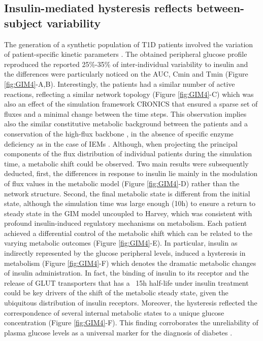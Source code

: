 \subsection{Insulin-mediated hysteresis reflects between-subject variability}
The generation of a synthetic population of T1D patients involved the variation of patient-specific kinetic parameters \cite{schaller2013generic}. The obtained peripheral glucose profile reproduced the reported 25\%-35\% of inter-individual variability to insulin and the differences were particularly noticed on the AUC, Cmin and Tmin (Figure \ref{fig:GIM4}-A,B). Interestingly, the patients had a similar number of active reactions, reflecting a similar network topology (Figure \ref{fig:GIM4}-C) which was also an effect of the simulation framework CRONICS that ensured a sparse set of fluxes and a minimal change between the time steps. This observation implies also the similar constitutive metabolic background between the patients and a conservation of the high-flux backbone \cite{almaas2004global}, in the absence of specific enzyme deficiency as in the case of IEMs \cite{sahoo2012compendium}. Although, when projecting the principal components of the flux distribution of individual patients during the simulation time, a metabolic shift could be observed. Two main results were subsequently deducted, first, the differences in response to insulin lie mainly in the modulation of flux values in the metabolic model (Figure \ref{fig:GIM4}-D) rather than the network structure. Second, the final metabolic state is different from the initial state, although the simulation time was large enough (10h) to ensure a return to steady state in the GIM model uncoupled to Harvey, which was consistent  with profound insulin-induced regulatory mechanisms on metabolism. Each patient achieved a differential control of the metabolic shift which can be related to the varying metabolic outcomes (Figure \ref{fig:GIM4}-E). In particular, insulin as indirectly represented by the glucose peripheral levels, induced a hysteresis in metabolism (Figure \ref{fig:GIM4}-F) which denotes the dramatic metabolic changes of insulin administration. In fact, the binding of insulin to its receptor and the release of GLUT transporters that has a ~15h half-life under insulin treatment \cite{sargeant1993effect} could be key drivers of the shift of the metabolic steady state, given the ubiquitous distribution of insulin receptors. Moreover, the hysteresis reflected the correspondence of several internal  metabolic states to a unique glucose concentration (Figure \ref{fig:GIM4}-F). This finding corroborates the unreliability of plasma glucose levels as a universal marker for the diagnosis of diabetes \cite{bonora2011pros}. \\
